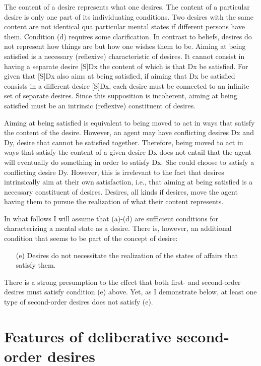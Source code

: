 \documentclass[output=paper,colorlinks,citecolor=brown
]{langscibook}
\begin{document}
The content of a desire represents what one desires. The content of a particular desire is only one part of its individuating conditions. Two desires with the same content are not identical qua particular mental states if different persons have them. 
Condition (d) requires some clarification. In contrast to beliefs, desires do not represent how things are but how one wishes them to be. Aiming at being satisfied is a necessary (reflexive) characteristic of desires. It cannot consist in having a separate desire [S]Dx the content of which is that Dx be satisfied. For given that [S]Dx also aims at being satisfied, if aiming that Dx be satisfied consists in a different desire [S]Dx, each desire must be connected to an infinite set of separate desires. Since this supposition is incoherent, aiming at being satisfied must be an intrinsic (reflexive) constituent of desires. 

	Aiming at being satisfied is equivalent to being moved to act in ways that satisfy the content of the desire. However, an agent may have conflicting desires Dx and Dy, desire that cannot be satisfied together. Therefore, being moved to act in ways that satisfy the content of a given desire Dx does not entail that the agent will eventually do something in order to satisfy Dx. She could choose to satisfy a conflicting desire Dy. However, this is irrelevant to the fact that desires intrinsically aim at their own satisfaction, i.e., that aiming at being satisfied is a necessary constituent of desires. Desires, all kinds if desires, move the agent having them to pursue the realization of what their content represents.
	
In what follows I will assume that (a)-(d) are sufficient conditions for characterizing a mental state as a desire. There is, however, an additional condition that seems to be part of the concept of desire:

\begin{itemize}
\item[(e)]	Desires do not necessitate the realization of the states of affairs that satisfy them.
\end{itemize}

There is a strong presumption to the effect that both first- and second-order desires must satisfy condition (e) above. Yet, as I demonstrate below, at least one type of second-order desires does not satisfy (e). 

\section{Features of deliberative second-order desires}
\end{document}
